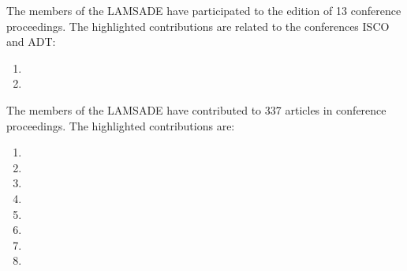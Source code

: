 \documentclass[version=last, pagesize, twoside=semi, DIV=calc, 12pt, a4paper, french, english, bibliography=totoc]{scrartcl}
\begin{document}
The members of the LAMSADE  
have participated to  the edition of 
13 conference proceedings. The highlighted contributions are related to the conferences ISCO and ADT:
\begin{enumerate}
\item  {}
\item {}
\end{enumerate}



The members of the LAMSADE  
have  contributed to 337 articles in conference proceedings. 
The highlighted contributions are:
\begin{enumerate}
\item {}
\item {}
\item  {}
\item  {}
\item {}
\item {}
\item {}
\item {} 
\end{enumerate}
\end{document}
